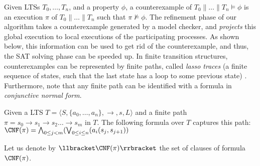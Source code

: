 Given LTSs $T_0,\dots,T_n$, and a {\LTLX} property $\phi$, a counterexample of $T_0 \parallel  \dots \parallel T_n \vDash \phi$ is an execution $\pi$ of $T_0 \parallel  \dots \parallel T_n$ such that $\pi \nvDash \phi$.
The refinement phase of our algorithm takes a counterexample generated by a model checker, and \emph{projects} this global execution  to local executions of the participating processes. As shown below,  this information can be used to get rid of the counterexample, and thus, the  SAT solving phase can be speeded up.
In finite transition structures, counterexamples can be represented by finite paths, called \emph{lasso traces} (a finite sequence of states, such that the last state has a loop to some previous state) \cite{Biere+1999}. Furthermore, note that any finite path can be identified with a formula in \emph{conjunctive normal form}. 
\begin{definition}Given a LTS $T=\langle S, \{a_0,\dots,a_n\}, \rightarrow, s, L \rangle$ and a finite path $\pi = s_0 \rightarrow s_1 \rightarrow s_2 \dots \rightarrow s_{m}$ in $T$. The following  formula over $T$ captures this path:
$
	\CNF(\pi) = \bigwedge_{0 \leq j < m}(\bigvee_{0 \leq i \leq n}(a_i(s_j,s_{j+1}))  %
$
\end{definition}
	Let us denote by  $\llbracket \CNF(\pi) \rrbracket$ the  set of clauses of formula  $\CNF(\pi)$.

